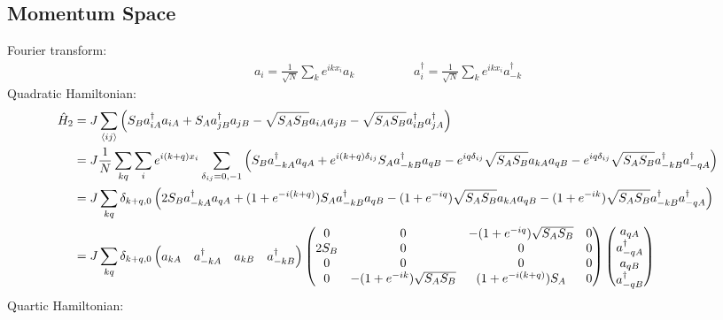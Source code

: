 \documentclass{article}
\begin{document}
\subsection{Momentum Space}
Fourier transform:
\begin{align}
	a_i = \frac{1}{\sqrt N} \sum_k e^{ikx_i} a_k \hspace{2cm} a_i^\dagger = \frac{1}{\sqrt N} \sum_k e^{ikx_i} a_{-k}^\dagger
\end{align}
Quadratic Hamiltonian:
\begin{align}
	\hat H_2 &= J \sum_{\braket{ij}} \left( S_B a_{iA}^\dagger a_{iA} + S_A a_{jB}^\dagger a_{jB} - \sqrt{S_A S_B} a_{iA} a_{jB} - \sqrt{S_A S_B} a_{iB}^\dagger a_{jA}^ \dagger \right) \\
%
	&= J \frac{1}{N} \sum_{kq} \sum_i e^{i(k+q)x_i} \sum_{\delta_{ij} = 0, -1} \left( S_B a_{-kA}^\dagger a_{qA} + e^{i(k+q) \delta_{ij}} S_A a_{-kB}^\dagger a_{qB} -e^{iq \delta_{ij}} \sqrt{S_A S_B} a_{kA} a_{qB} - e^{iq \delta_{ij}} \sqrt{S_A S_B} a_{-kB}^\dagger a_{-qA}^\dagger \right) \\
%
	&= J \sum_{kq} \delta_{k+q,0} \left( 2 S_B a_{-kA}^\dagger a_{qA} + (1 + e^{-i(k+q)}) S_A a_{-kB}^\dagger a_{qB} - (1 + e^{-iq}) \sqrt{S_A S_B} a_{kA} a_{qB} - (1 + e^{-ik}) \sqrt{S_A S_B} a_{-kB}^\dagger a_{-qA}^\dagger \right) \\
%
	&= J \sum_{kq} \delta_{k+q,0} \begin{pmatrix}
		a_{kA} & a_{-kA}^\dagger & a_{kB} & a_{-kB}^\dagger
	\end{pmatrix} \begin{pmatrix}
		0 & 0 & -(1 + e^{-iq}) \sqrt{S_A S_B} & 0 \\
		2S_B & 0 & 0 & 0 \\
		0 & 0 & 0 & 0 \\
		0 & -(1 + e^{-ik}) \sqrt{S_A S_B} & (1+ e^{-i(k+q)}) S_A & 0
	\end{pmatrix} \begin{pmatrix}
		a_{qA} \\ a_{-qA}^\dagger \\ a_{qB} \\ a_{-qB}^\dagger
	\end{pmatrix}
\end{align}
Quartic Hamiltonian:
\end{document}
